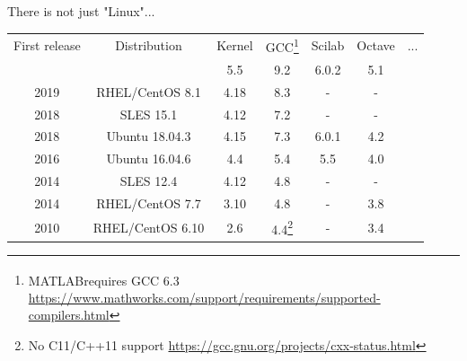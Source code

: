 \documentclass[xcolor=svgnames,xcolor=table,aspectratio=169]{beamer}
\newcommand{\regmark}{\textsuperscript{\tiny\textregistered}}
\begin{document}
\begin{frame}{There is not just "Linux"...}

\begin{table}
\begin{tabular}{cccc||ccc}
First release & Distribution     & Kernel
& GCC\footnote{MATLAB\regmark requires GCC 6.3
\url{https://www.mathworks.com/support/requirements/supported-compilers.html}}
& Scilab & Octave & ... \\
& & 5.5 & 9.2 & 6.0.2 & 5.1 & \\
\hline
2019          & RHEL/CentOS 8.1  & 4.18   & 8.3 &  -    &  -  & \\
2018          & SLES 15.1        & 4.12   & 7.2 &  -    &  -  & \\
2018          & Ubuntu 18.04.3   & 4.15   & 7.3 & 6.0.1 & 4.2 & \\
2016          & Ubuntu 16.04.6   & 4.4    & 5.4 & 5.5   & 4.0 & \\
2014          & SLES 12.4        & 4.12   & 4.8 &  -    &  -  & \\
2014          & RHEL/CentOS 7.7  & 3.10   & 4.8 &  -    & 3.8 & \\
2010          & RHEL/CentOS 6.10 & 2.6
& 4.4\footnote{No C11/C++11 support
\url{https://gcc.gnu.org/projects/cxx-status.html}}
& - & 3.4 \\
\end{tabular}
\end{table}

\end{frame}
\end{document}
